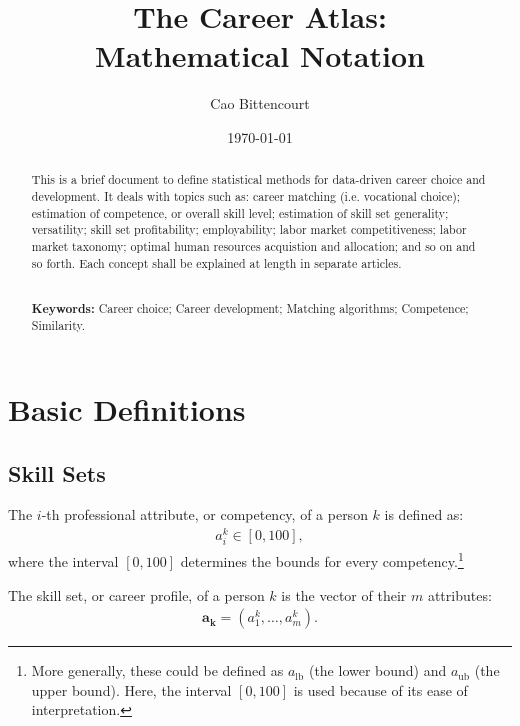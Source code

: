 \documentclass{elsarticle} %
\title{
    The Career Atlas:\\
    Mathematical Notation
}
\author{Cao Bittencourt}
\affiliation{{B. Sc. in Economics from EPGE (FGV), RJ, Brazil.}}
\affiliation{{Statistician at Atlas Career Guide Inc., FL, USA.}}
\date{\today}
\begin{document}

\begin{abstract}
    \noindent
    This is a brief document to define statistical methods for data-driven career choice and development. It deals with topics such as: career matching (i.e. vocational choice); estimation of competence, or overall skill level; estimation of skill set generality; versatility; skill set profitability; employability; labor market competitiveness; labor market taxonomy; optimal human resources acquistion and allocation; and so on and so forth. Each concept shall be explained at length in separate articles.

    \noindent
    \\ \textbf{Keywords:} Career choice; Career development; Matching algorithms; Competence; Similarity.
\end{abstract}

\maketitle


\tableofcontents
\newpage

\section{Basic Definitions}
\subsection{Skill Sets}
The $i$-th professional attribute, or competency, of a person $k$ is defined
as:
\begin{gather}
    a_{i}^{k}
    \in [0, 100]
    ,
\end{gather}
where the interval $[0,100]$ determines the bounds for every competency.\footnote[1]{
    More generally, these could be defined as $a_\text{lb}$ (the lower bound) and $a_\text{ub}$ (the upper bound). Here, the interval $[0,100]$ is used because of its ease of interpretation.
}

The skill set, or career profile, of a person $k$ is the vector of their $m$
attributes:
\begin{gather}
    \boldsymbol{a_k} = (a_{1}^{k}, \dots, a_{m}^{k})
    .
\end{gather}
\end{document}
